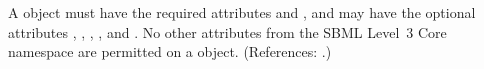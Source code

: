 A \Compartment object must have the required attributes  and
, and may have the optional attributes ,
, , ,  and
.  No other attributes from the SBML Level~3 Core namespace
are permitted on a \Compartment object.  (References: .)
